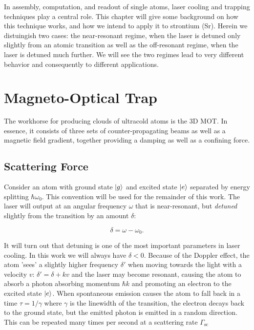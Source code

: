 In assembly, computation, and readout of single atoms, laser cooling and trapping techniques play a central role. 
This chapter will give some background on how this technique works, and how we intend to apply it to strontium (Sr). Herein we distuingish two cases: the near-resonant regime, when the laser is detuned only slightly from an atomic transition as well as the off-resonant regime, when the laser is detuned much further. 
We will see the two regimes lead to very different behavior and consequently to different applications.

\section{Magneto-Optical Trap}

The workhorse for producing clouds of ultracold atoms is the 3D \ac{MOT}. 
In essence, it consists of three sets of counter-propagating beams as well as a magnetic field gradient, together providing a damping as well as a confining force. 

\subsection{Scattering Force}

Consider an atom with ground state $\lvert g\rangle$ and excited state $\lvert e\rangle$ separated by energy splitting $\hbar \omega_0$.
This convention will be used for the remainder of this work.
The laser will output at an angular frequency $\omega$ that is near-resonant, but \emph{detuned} slightly from the transition by an amount $\delta$:

\begin{equation}\label{detuning}
	\delta = \omega - \omega_0.
\end{equation}

It will turn out that detuning is one of the most important parameters in laser cooling. 
In this work we will always have $\delta <0$. 
Because of the Doppler effect, the atom 'sees' a slightly higher frequency $\delta'$ when moving towards the light with a velocity $v$: $\delta'=\delta+k v$ and the laser may become resonant, causing the atom to absorb a photon absorbing momentum $\hbar k$ and promoting an electron to the excited state $\lvert e\rangle$.
When spontaneous emission causes the atom to fall back in a time $\tau = 1/\gamma$ where $\gamma$ is the linewidth of the transition, the electron decays back to the ground state, but the emitted photon is emitted in a random direction. 
This can be repeated many times per second at a scattering rate $\Gamma_{\text{sc}}$ \cite{Metcalf1999}

